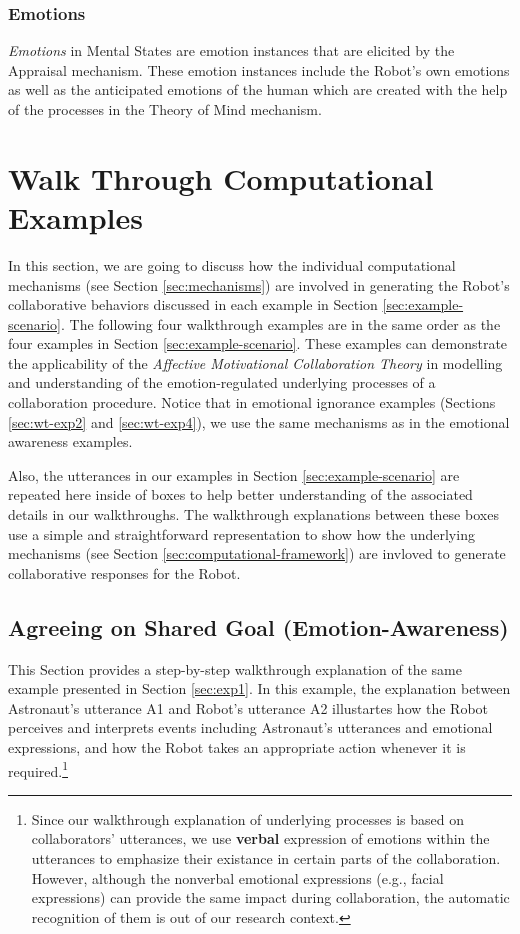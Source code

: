 \subsubsection{Emotions}

\textit{Emotions} in Mental States are emotion instances that are elicited by
the Appraisal mechanism. These emotion instances include the Robot's own
emotions as well as the anticipated emotions of the human which are created with
the help of the processes in the Theory of Mind mechanism.

\section{Walk Through Computational Examples}
\label{sec:wtce}

In this section, we are going to discuss how the individual computational
mechanisms (see Section \ref{sec:mechanisms}) are involved in generating the
Robot's collaborative behaviors discussed in each example in Section
\ref{sec:example-scenario}. The following four walkthrough examples are in the
same order as the four examples in Section \ref{sec:example-scenario}. These
examples can demonstrate the applicability of the \textit{Affective Motivational
Collaboration Theory} in modelling and understanding of the emotion-regulated
underlying processes of a collaboration procedure. Notice that in emotional
ignorance examples (Sections \ref{sec:wt-exp2} and \ref{sec:wt-exp4}), we use
the same mechanisms as in the emotional awareness examples.

Also, the utterances in our examples in Section \ref{sec:example-scenario} are
repeated here inside of boxes to help better understanding of the associated
details in our walkthroughs. The walkthrough explanations between these boxes
use a simple and straightforward representation to show how the underlying
mechanisms (see Section \ref{sec:computational-framework}) are invloved to
generate collaborative responses for the Robot.

\subsection{Agreeing on Shared Goal (Emotion-Awareness)}
\label{sec:wt-exp1}

This Section provides a step-by-step walkthrough explanation of the same
example presented in Section \ref{sec:exp1}. In this example, the explanation
between Astronaut's utterance A1 and Robot's utterance A2 illustartes how the
Robot perceives and interprets events including Astronaut's utterances and
emotional expressions, and how the Robot takes an appropriate action whenever it
is required.\footnote{Since our walkthrough explanation of underlying processes
is based on collaborators' utterances, we use \textbf{verbal} expression of
emotions within the utterances to emphasize their existance in certain parts of
the collaboration. However, although the nonverbal emotional expressions (e.g.,
facial expressions) can provide the same impact during collaboration, the
automatic recognition of them is out of our research context.}\\

